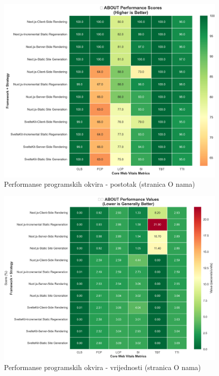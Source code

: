 \begin{figure}[H]
    \centering
    \includegraphics[width=\textwidth]{slike/rezultati/about/about_performance_scores.png}
    \caption{Performanse programskih okvira - postotak (stranica O nama)}
    \label{fig:testiranje-o-nama-postotak}
\end{figure}

\begin{figure}[H]
    \centering
    \includegraphics[width=\textwidth]{slike/rezultati/about/about_performance_values.png}
    \caption{Performanse programskih okvira - vrijednosti (stranica O nama)}
    \label{fig:testiranje-o-nama-vrijednosti}
\end{figure}

